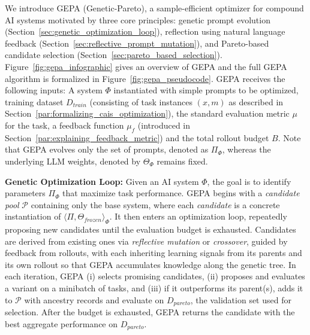 

We introduce GEPA (Genetic-Pareto), a sample-efficient optimizer for compound AI systems motivated by three core principles: genetic prompt evolution (Section~\ref{sec:genetic_optimization_loop}), reflection using natural language feedback (Section~\ref{sec:reflective_prompt_mutation}), and Pareto-based candidate selection (Section~\ref{sec:pareto_based_selection}). Figure~\ref{fig:gepa_infographic} gives an overview of GEPA and the full GEPA algorithm is formalized in Figure~\ref{fig:gepa_pseudocode}.
GEPA receives the following inputs: A system $\Phi$ instantiated with simple prompts to be optimized, training dataset $D_{train}$ (consisting of task instances $(x, m)$ as described in Section~\ref{par:formalizing_cais_optimization}), the standard evaluation metric $\mu$ for the task, a feedback function $\mu_f$ (introduced in Section~\ref{par:explaining_feedback_metric}) and the total rollout budget $B$. Note that GEPA evolves only the set of prompts, denoted as $\Pi_\Phi$, whereas the underlying LLM weights, denoted by $\Theta_\Phi$ remains fixed.


\noindent \textbf{Genetic Optimization Loop:}
\label{sec:genetic_optimization_loop}
Given an AI system $\Phi$, the goal is to identify parameters $\Pi_\Phi$ that maximize task performance.
GEPA begins with a \textit{candidate pool} $\mathcal{P}$ containing only the base system, where each \textit{candidate} is a concrete instantiation of $\langle \Pi, \Theta_{frozen} \rangle_\Phi$.
It then enters an optimization loop, repeatedly proposing new candidates until the evaluation budget is exhausted.
Candidates are derived from existing ones via \textit{reflective mutation} or \textit{crossover}, guided by feedback from rollouts, with each inheriting learning signals from its parents and its own rollout so that GEPA accumulates knowledge along the genetic tree.
In each iteration, GEPA (i) selects promising candidates, (ii) proposes and evaluates a variant on a minibatch of tasks, and (iii) if it outperforms its parent(s), adds it to $\mathcal{P}$ with ancestry records and evaluate on $D_{pareto}$, the validation set used for selection.
After the budget is exhausted, GEPA returns the candidate with the best aggregate performance on $D_{pareto}$.

